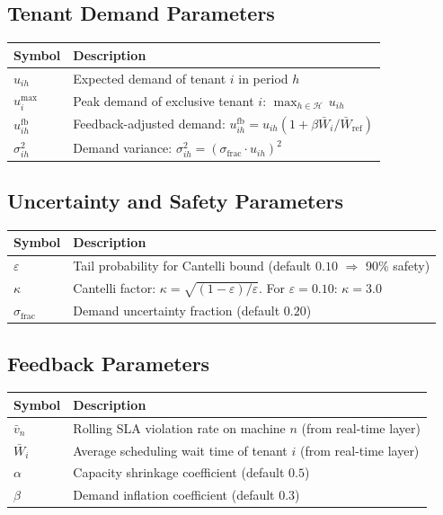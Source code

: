 \documentclass[11pt,a4paper]{article}
\newcommand{\PH}{\mathcal{H}}
\newcommand{\ufb}{u^{\mathrm{fb}}}
\newcommand{\umax}{u^{\max}}
\begin{document}
\subsection*{Tenant Demand Parameters}
\begin{center}
\begin{tabular}{p{2.5cm} p{10cm}}
\toprule
Symbol & Description \\
\midrule
$u_{ih}$ & Expected demand of tenant $i$ in period $h$ \\
$\umax_i$ & Peak demand of exclusive tenant $i$: $\max_{h\in\PH}\,u_{ih}$ \\
$\ufb_{ih}$ & Feedback-adjusted demand: $\ufb_{ih} = u_{ih}(1+\beta\bar{W}_i/\bar{W}_{\mathrm{ref}})$ \\
$\sigma^2_{ih}$ & Demand variance: $\sigma^2_{ih} = (\sigma_{\mathrm{frac}}\cdot u_{ih})^2$ \\
\bottomrule
\end{tabular}
\end{center}

\subsection*{Uncertainty and Safety Parameters}
\begin{center}
\begin{tabular}{p{2.5cm} p{10cm}}
\toprule
Symbol & Description \\
\midrule
$\varepsilon$ & Tail probability for Cantelli bound (default $0.10$ $\Rightarrow$ 90\% safety) \\
$\kappa$ & Cantelli factor: $\kappa = \sqrt{(1-\varepsilon)/\varepsilon}$.
          For $\varepsilon=0.10$: $\kappa=3.0$ \\
$\sigma_{\mathrm{frac}}$ & Demand uncertainty fraction (default $0.20$) \\
\bottomrule
\end{tabular}
\end{center}

\subsection*{Feedback Parameters}
\begin{center}
\begin{tabular}{p{2.5cm} p{10cm}}
\toprule
Symbol & Description \\
\midrule
$\bar{v}_n$ & Rolling SLA violation rate on machine $n$ (from real-time layer) \\
$\bar{W}_i$ & Average scheduling wait time of tenant $i$ (from real-time layer) \\
$\alpha$ & Capacity shrinkage coefficient (default $0.5$) \\
$\beta$ & Demand inflation coefficient (default $0.3$) \\
\bottomrule
\end{tabular}
\end{center}
\end{document}
